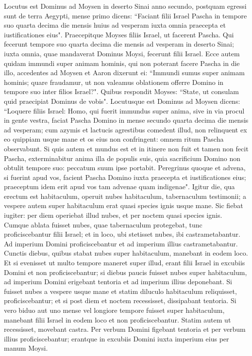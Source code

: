 \begin{biblechapter}  
\verse Locutus est Dominus ad Moysen in deserto Sinai anno secundo, postquam egressi sunt de terra Aegypti, mense primo dicens: 
\verse “Faciant filii Israel Pascha in tempore suo 
\verse quarta decima die mensis huius ad vesperam iuxta omnia praecepta et iustificationes eius". 
\verse Praecepitque Moyses filiis Israel, ut facerent Pascha. 
\verse Qui fecerunt tempore suo quarta decima die mensis ad vesperam in deserto Sinai; iuxta omnia, quae mandaverat Dominus Moysi, fecerunt filii Israel. 
\verse Ecce autem quidam immundi super animam hominis, qui non poterant facere Pascha in die illo, accedentes ad Moysen et Aaron 
\verse dixerunt ei: “Immundi sumus super animam hominis; quare fraudamur, ut non valeamus oblationem offerre Domino in tempore suo inter filios Israel?". 
\verse Quibus respondit Moyses: “State, ut consulam quid praecipiat Dominus de vobis". 
\verse Locutusque est Dominus ad Moysen dicens: 
\verse “Loquere filiis Israel: Homo, qui fuerit immundus super anima, sive in via procul in gente vestra, faciat Pascha Domino 
\verse in mense secundo quarta decima die mensis ad vesperam; cum azymis et lactucis agrestibus comedent illud, 
\verse non relinquent ex eo quippiam usque mane et os eius non confringent: omnem ritum Pascha observabunt. 
\verse Si quis autem et mundus est et in itinere non fuit et tamen non fecit Pascha, exterminabitur anima illa de populis suis, quia sacrificium Domino non obtulit tempore suo: peccatum suum ipse portabit. 
\verse Peregrinus quoque et advena, si fuerint apud vos, facient Pascha Domino iuxta praecepta et iustificationes eius; praeceptum idem erit apud vos tam advenae quam indigenae". 
\verse Igitur die, qua erectum est habitaculum, operuit nubes habitaculum, tabernaculum testimonii; a vespere autem super habitaculum erat quasi species ignis usque mane. 
\verse Sic fiebat iugiter: per diem operiebat illud nubes, et per noctem quasi species ignis. 
\verse Cumque ablata fuisset nubes, quae tabernaculum protegebat, tunc proficiscebantur filii Israel; et in loco, ubi stetisset nubes, ibi castrametabantur. 
\verse Ad imperium Domini proficiscebantur et ad imperium illius castrametabantur. Cunctis diebus, quibus stabat nubes super habitaculum, manebant in eodem loco. 
\verse Et si evenisset ut multo tempore maneret super illud, erant filii Israel in excubiis Domini et non proficiscebantur; 
\verse si diebus paucis fuisset nubes super habitaculum, ad imperium Domini erigebant tentoria et ad imperium illius deponebant. 
\verse Si fuisset nubes a vespere usque mane et statim diluculo habitaculum reliquisset, proficiscebantur; et si post diem et noctem recessisset, dissipabant tentoria. 
\verse Si vero biduo aut uno mense vel longiore tempore fuisset super habitaculum, manebant filii Israel in eodem loco et non proficiscebantur. Statim autem ut recessisset, movebant castra. 
\verse Per verbum Domini figebant tentoria et per verbum illius proficiscebantur; erantque in excubiis Domini iuxta imperium eius per manum Moysi. 
\end{biblechapter}


